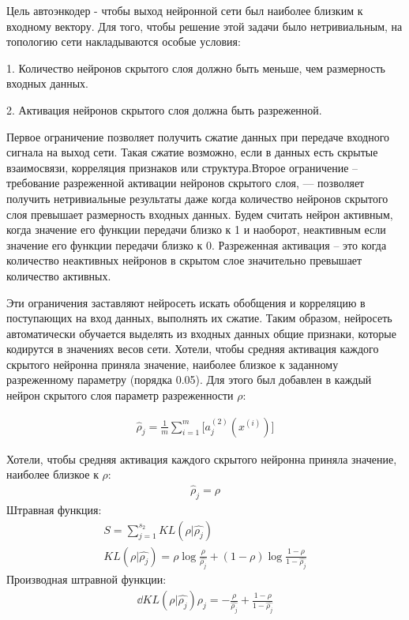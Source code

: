 \documentclass[12pt]{article}
\begin{document}
Цель автоэнкодер - чтобы выход нейронной сети был наиболее близким к входному вектору. Для того, чтобы решение этой задачи было нетривиальным, на топологию сети накладываются особые условия: 

1. Количество нейронов скрытого слоя должно быть меньше, чем размерность входных данных.

2. Активация нейронов скрытого слоя должна быть разреженной.

Первое ограничение позволяет получить сжатие данных при передаче входного сигнала на выход сети. Такая сжатие возможно, если в данных есть скрытые взаимосвязи, корреляция признаков или структура.Второе ограничение – требование разреженной активации нейронов скрытого слоя, — позволяет получить нетривиальные результаты даже когда количество нейронов скрытого слоя превышает размерность входных данных. Будем считать нейрон активным, когда значение его функции передачи близко к 1 и наоборот, неактивным если значение его функции передачи близко к 0. Разреженная активация – это когда количество неактивных нейронов в скрытом слое значительно превышает количество активных.

Эти ограничения заставляют нейросеть искать обобщения и корреляцию в поступающих на вход данных, выполнять их сжатие. Таким образом, нейросеть автоматически обучается выделять из входных данных общие признаки, которые кодирутся в значениях весов сети. Хотели, чтобы средняя активация каждого скрытого нейронна приняла значение, наиболее близкое к заданному разреженному параметру (порядка 0.05). Для этого был добавлен в каждый нейрон скрытого слоя параметр разреженности $\rho$:

  \begin{align}
	\hat \rho_j=\frac{1}{m}\sum_{i=1}^m\biggl[a^{(2)}_j(x^{(i)})\biggl]
  \end{align}

Хотели, чтобы средняя активация каждого скрытого нейронна приняла значение, наиболее близкое к $\rho$:
  \begin{align}
	\hat \rho_j=\rho
  \end{align}
  Штравная функция:
  \begin{align}
	S=\sum_{j=1}^{s_2}{KL({\rho}|{\hat{\rho_j}})}\\
	KL({\rho}|{\hat{\rho_j}})=\rho\log{\frac{\rho}{\hat{\rho_j}}}+(1-\rho)\log{\frac{1-\rho}{1-\hat{\rho_j}}}
  \end{align}
  Производная штравной функции:
  \begin{align}
	\dd{KL({\rho}|{\hat{\rho_j}})}{\rho_j}=-\frac{\rho}{\hat{\rho_j}} + \frac{1-\rho}{1-\hat{\rho_j}}
  \end{align}
\end{document}
